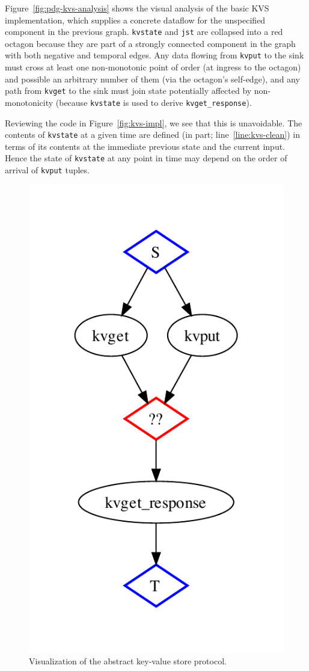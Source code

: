 Figure~\ref{fig:pdg-kvs-analysis} shows the visual analysis of the basic KVS
implementation, which supplies a concrete dataflow for the unspecified component
in the previous graph.  \texttt{kvstate} and \texttt{jst} are collapsed into a
red octagon because they are part of a strongly connected component in the graph
with both negative and temporal edges.  Any data flowing from \texttt{kvput} to
the sink must cross at least one non-monotonic point of order (at ingress to the
octagon) and possible an arbitrary number of them (via the octagon's self-edge),
and any path from \texttt{kvget} to the sink must join state potentially
affected by non-monotonicity (because \texttt{kvstate} is used to derive
\texttt{kvget\_response}).

Reviewing the code in Figure~\ref{fig:kvs-impl}, we see that this is
unavoidable.  The contents of \texttt{kvstate} at a given time are defined (in
part; line~\ref{line:kvs-clean}) in terms of its contents at the immediate
previous state and the current input.  Hence the state of \texttt{kvstate} at
any point in time may depend on the order of arrival of \texttt{kvput} tuples.



\begin{figure}[t]
\centering
\includegraphics[width=0.4\linewidth]{fig/kvs_proto_pdg.pdf}
\vspace{-10pt}
\caption{Visualization of the abstract key-value store protocol.}
\label{fig:pdg-kvs-proto-analysis}
\vspace{-2pt}
\end{figure}

